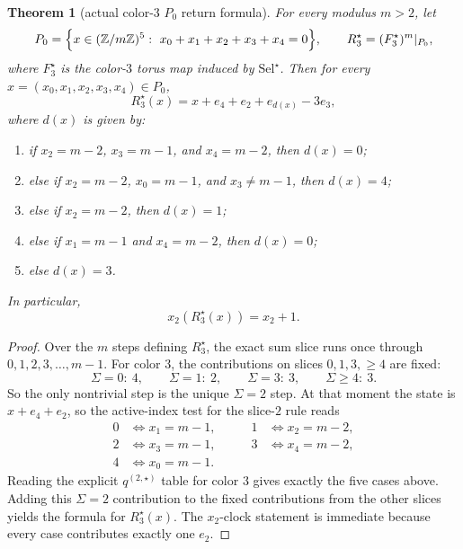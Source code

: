 \documentclass[11pt]{article}
\newtheorem{theorem}{Theorem}[section]
\newcommand{\Z}{\mathbb Z}
\newcommand{\SelStar}{\mathrm{Sel}^{\star}}
\newcommand{\Pzero}{P_0}
\begin{document}
\begin{theorem}[actual color-$3$ \(P_0\) return formula]
\label{thm:M5-color3-R}
For every modulus \(m>2\), let
\[
\Pzero=\Bigl\{x\in(\Z/m\Z)^5:\ x_0+x_1+x_2+x_3+x_4=0\Bigr\},
\qquad
R_3^\star=(F_3^\star)^m\vert_{\Pzero},
\]
where \(F_3^\star\) is the color-$3$ torus map induced by \(\SelStar\).
Then for every \(x=(x_0,x_1,x_2,x_3,x_4)\in \Pzero\),
\[
R_3^\star(x)=x+e_4+e_2+e_{d(x)}-3e_3,
\]
where \(d(x)\) is given by:
\begin{enumerate}[label=\textup{(\arabic*)},leftmargin=2.8em]
\item if \(x_2=m-2\), \(x_3=m-1\), and \(x_4=m-2\), then \(d(x)=0\);
\item else if \(x_2=m-2\), \(x_0=m-1\), and \(x_3\neq m-1\), then \(d(x)=4\);
\item else if \(x_2=m-2\), then \(d(x)=1\);
\item else if \(x_1=m-1\) and \(x_4=m-2\), then \(d(x)=0\);
\item else \(d(x)=3\).
\end{enumerate}
In particular,
\[
x_2(R_3^\star(x))=x_2+1.
\]
\end{theorem}

\begin{proof}
Over the \(m\) steps defining \(R_3^\star\), the exact sum slice runs once
through \(0,1,2,3,\dots,m-1\).
For color \(3\), the contributions on slices \(0,1,3,\ge 4\) are fixed:
\[
\Sigma=0:\ 4,\qquad
\Sigma=1:\ 2,\qquad
\Sigma=3:\ 3,\qquad
\Sigma\ge 4:\ 3.
\]
So the only nontrivial step is the unique \(\Sigma=2\) step.
At that moment the state is \(x+e_4+e_2\), so the active-index test for the
slice-\(2\) rule reads
\[
\begin{aligned}
0&\iff x_1=m-1, &\qquad 1&\iff x_2=m-2,\\
2&\iff x_3=m-1, &\qquad 3&\iff x_4=m-2,\\
4&\iff x_0=m-1. &&
\end{aligned}
\]
Reading the explicit \(q^{(2,\star)}\) table for color \(3\) gives exactly the
five cases above.
Adding this \(\Sigma=2\) contribution to the fixed contributions from the other
slices yields the formula for \(R_3^\star(x)\).
The \(x_2\)-clock statement is immediate because every case contributes exactly
one \(e_2\).
\end{proof}
\end{document}
